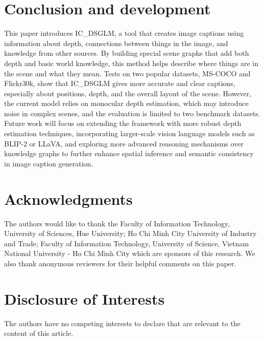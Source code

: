 \documentclass[runningheads,14pt]{llncs}
\begin{document}
\section{Conclusion and development}

This paper introduces IC\_DSGLM, a tool that creates image captions using
information about depth, connections between things in the image, and knowledge
from other sources. By building special scene graphs that add both depth and
basic world knowledge, this method helps describe where things are in the scene
and what they mean. Tests on two popular datasets, MS-COCO and Flickr30k, show
that IC\_DSGLM gives more accurate and clear captions, especially about
positions, depth, and the overall layout of the scene. However, the current
model relies on monocular depth estimation, which may introduce noise in
complex scenes, and the evaluation is limited to two benchmark datasets. Future
work will focus on extending the framework with more robust depth estimation
techniques, incorporating larger-scale vision language models such as BLIP-2 or
LLaVA, and exploring more advanced reasoning mechanisms over knowledge graphs
to further enhance spatial inference and semantic consistency in image caption
generation.

\section*{Acknowledgments}
The authors would like to thank the Faculty of Information Technology, University of Sciences, Hue University; Ho Chi Minh City University of Industry and Trade; Faculty of Information Technology, University of Science, Vietnam National University - Ho Chi Minh City which are sponsors of this research. We also thank anonymous reviewers for their helpful comments on this paper.
\section*{Disclosure of Interests}The authors have no competing interests to declare that are relevant to the content of this article. 



\end{document}
